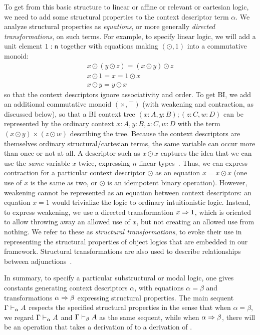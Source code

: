 To get from this basic structure to linear or affine or relevant or
cartesian logic, we need to add some structural properties to the
context descriptor term $\alpha$.  We analyze structural properties as
\emph{equations}, or more generally \emph{directed transformations}, on
such terms.  For example, to specify linear logic, we will add a unit
element $1 : \mathsf{n}$ together with equations making $(\odot,1)$ into a
commutative monoid:
\[
\begin{array}{c}
x \odot (y \odot z) = (x \odot y) \odot z\\
x \odot 1 = x = 1 \odot x\\
x \odot y = y \odot x
\end{array}
\]
so that the context descriptors ignore associativity and order.  To get
BI, we add an additional commutative monoid $(\times,\top)$ (with
weakening and contraction, as discussed below), so that a BI context
tree $(x:A,y:B);(z:C,w:D)$ can be represented by the ordinary context
$x:A,y:B,z:C,w:D$ with the term $(x \odot y) \times (z \odot w)$
describing the tree.  Because the context descriptors are themselves
ordinary structural/cartesian terms, the same variable can occur more
than once or not at all.  A descriptor such as $x \odot x$ captures the
idea that we can use the \emph{same} variable $x$ twice, expressing
$n$-linear types~\citep{reed08namessubstructural}.  Thus, we can express
contraction for a particular context descriptor $\odot$ as an equation
$x = x \odot x$ (one use of $x$ is the same as two, or $\odot$ is an
idempotent binary operation).  However, weakening cannot be represented
as an equation between context descriptors: an equation $x = 1$ would
trivialize the logic to ordinary intuitionistic logic.  Instead, to
express weakening, we use a directed transformation $x \Rightarrow 1$, which is
oriented to allow throwing away an allowed use of $x$, but not creating
an allowed use from nothing.  We refer to these as \emph{structural
  transformations}, to evoke their use in representing the structural
properties of object logics that are embedded in our framework.
Structural transformations are also used to describe relationships
between adjunctions~\citep{ls16adjoint}.

In summary, to specify a particular substructural or modal logic, one
gives constants generating context descriptors $\alpha$, with equations
$\alpha = \beta$ and transformations $\alpha \Rightarrow \beta$ expressing
structural properties.  The main sequent $\Gamma \vdash_{\alpha} A$
respects the specified structural properties in the sense that when
$\alpha = \beta$, we regard $\Gamma \vdash_{\alpha} A$ and
$\Gamma \vdash_{\beta} A$ as the same sequent, while when $\alpha \Rightarrow
\beta$, there will be an operation that takes a derivation of
 to a derivation of .


